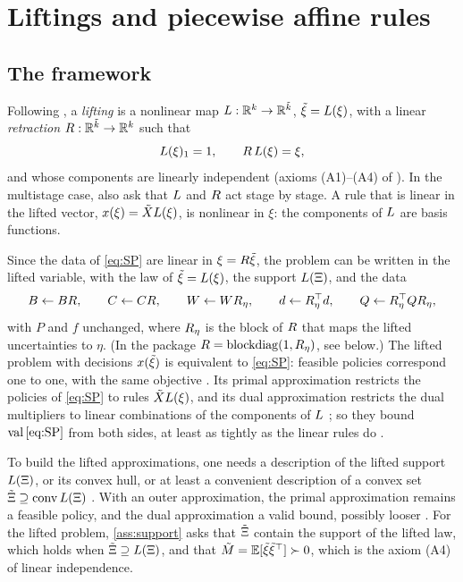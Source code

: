 \section{Liftings and piecewise affine rules}
\label{sec:liftings}

\subsection{The framework}

Following \citet[Section~3]{GWK2015}, a \emph{lifting} is a nonlinear map $L : \mathbb{R}^k \to \mathbb{R}^{\tilde k}$, $\tilde\xi = L(\xi)$, with a linear \emph{retraction} $R : \mathbb{R}^{\tilde k} \to \mathbb{R}^k$ such that
\[
L(\xi)_1 = 1, \qquad R\,L(\xi) = \xi,
\]
and whose components are linearly independent (axioms (A1)--(A4) of \citet{GWK2015}).
In the multistage case, \citet[axiom (A5)]{GWK2015} also ask that $L$ and $R$ act stage by stage.
A rule that is linear in the lifted vector, $x(\xi) = \tilde XL(\xi)$, is nonlinear in $\xi$:
the components of $L$ are basis functions.

Since the data of \eqref{eq:SP} are linear in $\xi = R\tilde\xi$, the problem can be written in the lifted variable,
with the law of $\tilde\xi = L(\xi)$, the support $L(\Xi)$, and the data
\begin{equation}
\label{eq:lifted-data}
B \leftarrow BR, \qquad C \leftarrow CR, \qquad W \leftarrow WR_\eta, \qquad d \leftarrow R_\eta^\top d, \qquad Q \leftarrow R_\eta^\top Q R_\eta,
\end{equation}
with $P$ and $f$ unchanged, where $R_\eta$ is the block of $R$ that maps the lifted uncertainties to $\eta$.
(In the package $R = \operatorname{blockdiag}(1, R_\eta)$, see below.)
The lifted problem with decisions $x(\tilde\xi)$ is equivalent to \eqref{eq:SP}:
feasible policies correspond one to one, with the same objective \citep[Propositions~3.4 and~6.3]{GWK2015}.
Its primal approximation restricts the policies of \eqref{eq:SP} to rules $\tilde XL(\xi)$,
and its dual approximation restricts the dual multipliers to linear combinations of the components of $L$ \citep[Proposition~3.6]{GWK2015};
so they bound $\operatorname{val}\eqref{eq:SP}$ from both sides, at least as tightly as the linear rules do \citep[Theorem~3.8]{GWK2015}.

To build the lifted approximations,
one needs a description of the lifted support $L(\Xi)$,
or its convex hull,
or at least a convenient description of a convex set
$\tilde\Xi \supseteq \operatorname{conv}L(\Xi)$ \citep[conditions (S4) and its relaxation]{GWK2015}.
With an outer approximation, the primal approximation remains a feasible policy,
and the dual approximation a valid bound,
possibly looser \citep[Corollary~2.2]{GWK2015}.
For the lifted problem, \cref{ass:support} asks that $\tilde\Xi$ contain the support of the lifted law, which holds when $\tilde\Xi \supseteq L(\Xi)$,
and that $\tilde M = \mathbb{E}[\tilde\xi\tilde\xi^\top] \succ 0$, which is the axiom (A4) of linear independence.

